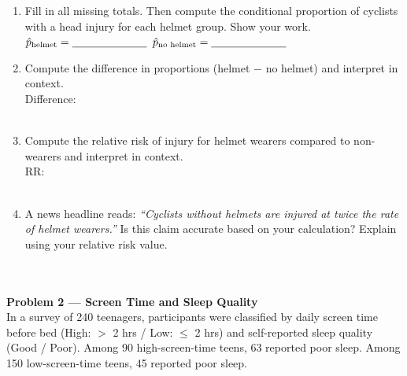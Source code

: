 \documentclass[10pt]{article}
\begin{document}
\begin{enumerate}[leftmargin=1.6em, itemsep=0.16in]

    \item Fill in all missing totals. Then compute the conditional proportion of cyclists
          with a head injury for each helmet group. Show your work.\\[10pt]
          $\hat{p}_{\text{helmet}} = \blank{2.4cm}$ \hfill $\hat{p}_{\text{no helmet}} = \blank{2.4cm}$

    \item Compute the difference in proportions (helmet $-$ no helmet) and interpret in context.\\[10pt]
          Difference: \blank{3cm}\\[8pt]
          \writeline\\[2pt]\writeline

    \item Compute the relative risk of injury for helmet wearers compared to non-wearers and
          interpret in context.\\[10pt]
          RR: \blank{3cm}\\[8pt]
          \writeline\\[2pt]\writeline

    \item A news headline reads: \textit{``Cyclists without helmets are injured at twice the
          rate of helmet wearers.''} Is this claim accurate based on your calculation?
          Explain using your relative risk value.\\[8pt]
          \writeline\\[2pt]\writeline\\[2pt]\writeline

\end{enumerate}

\vspace{0.22in}

\begin{tcolorbox}[colback=sky, colframe=navy, boxrule=0.9pt, arc=2mm,
    left=4mm, right=4mm, top=3mm, bottom=3mm]
\small\textbf{Problem 2 --- Screen Time and Sleep Quality}\\[4pt]
In a survey of 240 teenagers, participants were classified by daily screen time before bed
(High: $>$ 2 hrs / Low: $\leq$ 2 hrs) and self-reported sleep quality (Good / Poor).
Among 90 high-screen-time teens, 63 reported poor sleep.
Among 150 low-screen-time teens, 45 reported poor sleep.
\end{tcolorbox}
\end{document}
